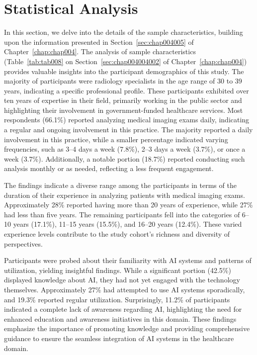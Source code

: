 \section{Statistical Analysis}
\label{chap:app002004}

In this section, we delve into the details of the sample characteristics, building upon the information presented in Section~\ref{sec:chap004005} of Chapter~\ref{chap:chap004}.
The analysis of sample characteristics (Table~\ref{tab:tab008} on Section~\ref{sec:chap004004002} of Chapter~\ref{chap:chap004}) provides valuable insights into the participant demographics of this study.
\textcolor{revised}{The majority of participants were radiology specialists in the age range of 30 to 39 years, indicating a specific professional profile.
These participants exhibited over ten years of expertise in their field, primarily working in the public sector and highlighting their involvement in government-funded healthcare services.}
Most respondents (66.1\%) reported analyzing medical imaging exams daily, indicating a regular and ongoing involvement in this practice.
The majority reported a daily involvement in this practice, while a smaller percentage indicated varying frequencies, such as 3--4 days a week (7.8\%), 2--3 days a week (3.7\%), or once a week (3.7\%).
Additionally, a notable portion (18.7\%) reported conducting such analysis monthly or as needed, reflecting a less frequent engagement.

The findings indicate a diverse range among the participants in terms of the duration of their experience in analyzing patients with medical imaging exams.
Approximately 28\% reported having more than 20 years of experience, while 27\% had less than five years.
The remaining participants fell into the categories of 6--10 years (17.1\%), 11--15 years (15.5\%), and 16--20 years (12.4\%).
These varied experience levels contribute to the study cohort's richness and diversity of perspectives.

Participants were probed about their familiarity with \ac{AI} systems and patterns of utilization, yielding insightful findings.
While a significant portion (42.5\%) displayed knowledge about \ac{AI}, they had not yet engaged with the technology themselves.
Approximately 27\% had attempted to use \ac{AI} systems sporadically, and 19.3\% reported regular utilization.
Surprisingly, 11.2\% of participants indicated a complete lack of awareness regarding \ac{AI}, highlighting the need for enhanced education and awareness initiatives in this domain.
These findings emphasize the importance of promoting knowledge and providing comprehensive guidance to ensure the seamless integration of \ac{AI} systems in the healthcare domain.

